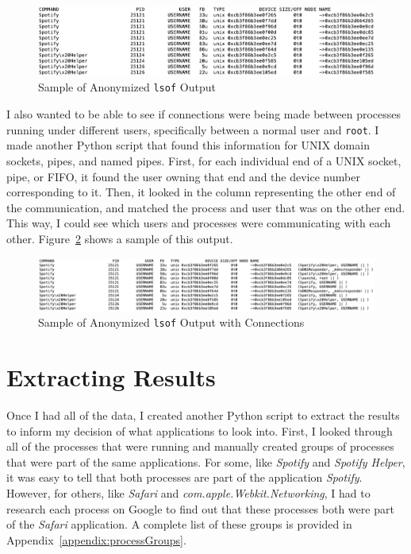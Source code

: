 \begin{figure}
\centering
\includegraphics[width=1\textwidth]{lsofAnon.png}
\caption{Sample of Anonymized \texttt{lsof} Output}
\label{fig:lsofAnon}
\end{figure}

I also wanted to be able to see if connections were being made between processes running under different users, specifically between a normal user and \texttt{root}.  I made another Python script that found this information for UNIX domain sockets, pipes, and named pipes.  First, for each individual end of a UNIX socket, pipe, or FIFO, it found the user owning that end and the device number corresponding to it.  Then, it looked in the column representing the other end of the communication, and matched the process and user that was on the other end.  This way, I could see which users and processes were communicating with each other.  Figure~\ref{fig:lsofConn} shows a sample of this output.

\begin{figure}
\centering
\includegraphics[width=1\textwidth]{lsofConn.png}
\caption{Sample of Anonymized \texttt{lsof} Output with Connections}
\label{fig:lsofConn}
\end{figure}

\section{Extracting Results}
\label{sec:extractResults}
Once I had all of the data, I created another Python script to extract the results to inform my decision of what applications to look into.  First, I  looked through all of the processes that were running and manually created groups of processes that were part of the same applications.  For some, like \textit{Spotify} and \textit{Spotify Helper}, it was easy to tell that both processes are part of the application \textit{Spotify}.  However, for others, like \textit{Safari} and \textit{com.apple.Webkit.Networking}, I had to research each process on Google to find out that these processes both were part of the \textit{Safari} application.  A complete list of these groups is provided in Appendix~\ref{appendix:processGroups}.

